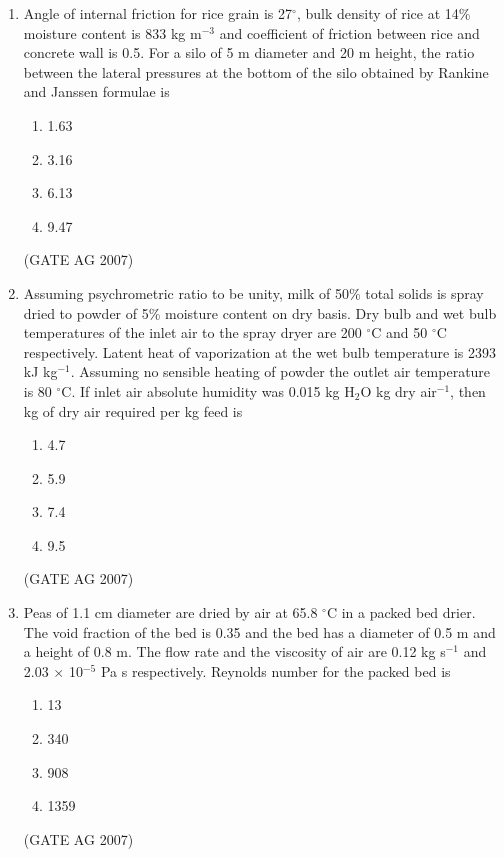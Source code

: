 \documentclass[journal,12pt,onecolumn]{IEEEtran}
\theoremstyle{remark}
\begin{document}
\begin{enumerate}
\item Angle of internal friction for rice grain is 27$^{\circ}$, bulk density of rice at 14\% moisture content is 833 kg m$^{-3}$ and coefficient of friction between rice and concrete wall is 0.5. For a silo of 5 m diameter and 20 m height, the ratio between the lateral pressures at the bottom of the silo obtained by Rankine and Janssen formulae is
\begin{multicols}{4}
\begin{enumerate}
    \item 1.63
    \item 3.16
    \item 6.13
    \item 9.47
\end{enumerate}
\end{multicols}
\hfill(GATE AG 2007)

\item Assuming psychrometric ratio to be unity, milk of 50\% total solids is spray dried to powder of 5\% moisture content on dry basis. Dry bulb and wet bulb temperatures of the inlet air to the spray dryer are 200 $^{\circ}$C and 50 $^{\circ}$C respectively. Latent heat of vaporization at the wet bulb temperature is 2393 kJ kg$^{-1}$. Assuming no sensible heating of powder the outlet air temperature is 80 $^{\circ}$C. If inlet air absolute humidity was 0.015 kg H$_2$O kg dry air$^{-1}$, then kg of dry air required per kg feed is
\begin{multicols}{4}
\begin{enumerate}
    \item 4.7
    \item 5.9
    \item 7.4
    \item 9.5
\end{enumerate}
\end{multicols}
\hfill(GATE AG 2007)

\item Peas of 1.1 cm diameter are dried by air at 65.8 $^{\circ}$C in a packed bed drier. The void fraction of the bed is 0.35 and the bed has a diameter of 0.5 m and a height of 0.8 m. The flow rate and the viscosity of air are 0.12 kg s$^{-1}$ and 2.03 $\times$ 10$^{-5}$ Pa s respectively. Reynolds number for the packed bed is
\begin{multicols}{4}
\begin{enumerate}
    \item 13
    \item 340
    \item 908
    \item 1359
\end{enumerate}
\end{multicols}
\hfill(GATE AG 2007)


\end{enumerate}
\end{document}
